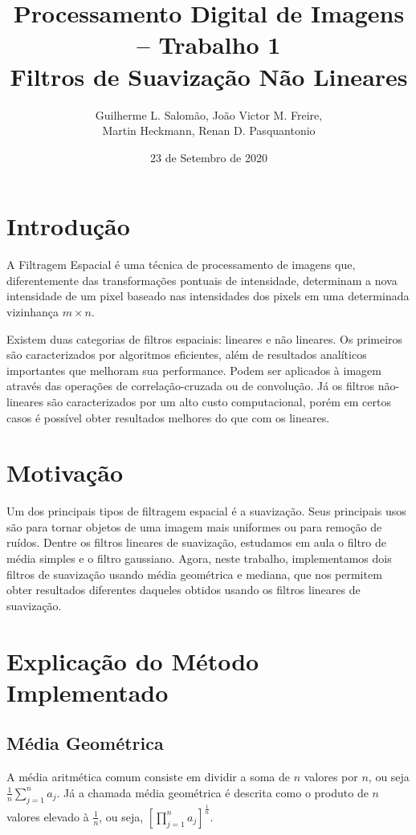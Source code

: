 \documentclass[12pt,a4paper]{article}
\title{Processamento Digital de Imagens – Trabalho 1\\Filtros de Suavização Não Lineares}
\author{Guilherme L. Salomão, João Victor M. Freire, \\Martin Heckmann, Renan D. Pasquantonio }
\date{23 de Setembro de 2020}
\begin{document}
\maketitle

\section{Introdução}

    A Filtragem Espacial é uma técnica de processamento de imagens que, diferentemente das transformações pontuais de intensidade, determinam a nova intensidade de um pixel baseado nas intensidades dos pixels em uma determinada vizinhança $m \times n$.
    
    Existem duas categorias de filtros espaciais: lineares e não lineares. Os primeiros são caracterizados por algoritmos eficientes, além de resultados analíticos importantes que melhoram sua performance. Podem ser aplicados à imagem através das operações de correlação-cruzada ou de convolução. Já os filtros não-lineares são caracterizados por um alto custo computacional, porém em certos casos é possível obter resultados melhores do que com os lineares.

\section{Motivação}
Um dos principais tipos de filtragem espacial é a suavização. Seus principais usos são para tornar objetos de uma imagem mais uniformes ou para remoção de ruídos. Dentre os filtros lineares de suavização, estudamos em aula o filtro de média simples e o filtro gaussiano. Agora, neste trabalho, implementamos dois filtros de suavização usando média geométrica e mediana, que nos permitem obter resultados diferentes daqueles obtidos usando os filtros lineares de suavização.

\section{Explicação do Método Implementado}
\subsection{Média Geométrica}
A média aritmética comum consiste em dividir a soma de $n$ valores por $n$, ou seja $\frac{1}{n}\sum_{j=1}^{n} a_j$. Já a chamada média geométrica é descrita como o produto de $n$ valores elevado à $\frac{1}{n}$, ou seja, $[\prod_{j=1}^{n} a_j]^{\frac{1}{n}}$.
\end{document}

